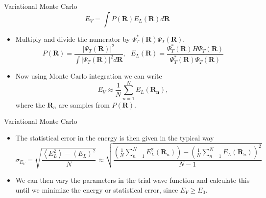 \documentclass{beamer}
\newcommand{\R}{\mathbf{R}}
\begin{document}
\begin{frame}{Variational Monte Carlo}
   \begin{equation*}
      E_V = \int P(\R)E_L(\R) d\R
   \end{equation*}
\begin{itemize}
   \item Multiply and divide the numerator by $\Psi_T^*(\R)\Psi_T(\R)$.
   \begin{equation*}
      P(\R) = \frac{|\Psi_T(\R)|^2}{\int|\Psi_T(\R)|^2d\R}, ~~~
      E_L(\R) = \frac{\Psi_T^*(\R) H \Psi_T(\R)}{\Psi_T^*(\R) \Psi_T(\R)}
   \end{equation*}
   \item Now using Monte Carlo integration we can write
   \begin{equation*}
      E_V \approx \frac{1}{N} \sum\limits_{n=1}^N E_L(\mathbf{R_n}),
   \end{equation*}
   where the $\R_n$ are samples from $P(\R)$.
\end{itemize}
\end{frame}

\begin{frame}{Variational Monte Carlo}
\begin{itemize}
   \item The statistical error in the energy is then given in the typical way
   \begin{equation*}
      \sigma_{E_V} = \sqrt{\frac{\left<E_L^2\right>-\left<E_L\right>^2}{N}} \approx \sqrt{\frac{\left(\frac{1}{N}\sum\limits_{n=1}^NE_L^2(\R_n)\right) - \left(\frac{1}{N}\sum\limits_{n=1}^NE_L(\R_n)\right)^2}{N-1}}
   \end{equation*}
   \item We can then vary the parameters in the trial wave function and calculate this until we minimize the energy or statistical error, since $E_V \ge E_0$.
\end{itemize}
\end{frame}
\end{document}
